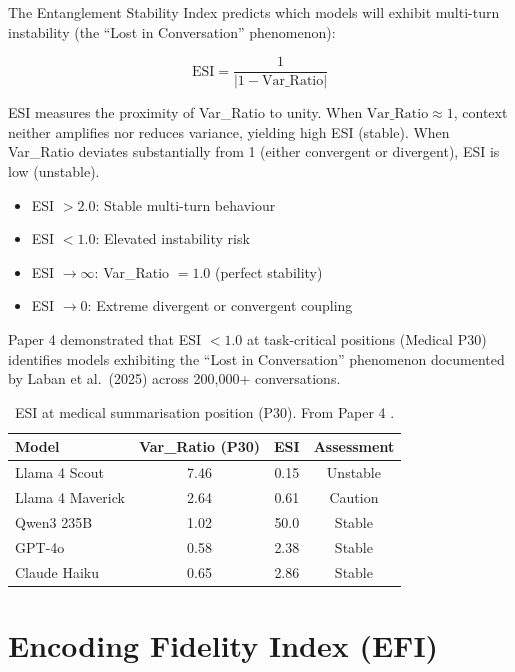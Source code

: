 \documentclass[11pt,a4paper]{article}
\begin{document}
The Entanglement Stability Index predicts which models will exhibit
multi-turn instability (the ``Lost in Conversation'' phenomenon):

\begin{equation}
    \text{ESI} = \frac{1}{\left| 1 - \text{Var\_Ratio} \right|}
\end{equation}

ESI measures the proximity of Var\_Ratio to unity. When
$\text{Var\_Ratio} \approx 1$, context neither amplifies nor
reduces variance, yielding high ESI (stable). When Var\_Ratio
deviates substantially from 1 (either convergent or divergent),
ESI is low (unstable).

\begin{itemize}
    \item ESI $> 2.0$: Stable multi-turn behaviour
    \item ESI $< 1.0$: Elevated instability risk
    \item ESI $\to \infty$: Var\_Ratio $= 1.0$ (perfect stability)
    \item ESI $\to 0$: Extreme divergent or convergent coupling
\end{itemize}

Paper 4 \citep{laxman2026d} demonstrated that ESI $< 1.0$ at task-critical
positions (Medical P30) identifies models exhibiting the ``Lost in Conversation''
phenomenon documented by Laban et al.\ (2025) across 200,000+ conversations.

\begin{table}[H]
\centering
\begin{tabular}{lccc}
\toprule
\textbf{Model} & \textbf{Var\_Ratio (P30)} & \textbf{ESI} & \textbf{Assessment} \\
\midrule
Llama 4 Scout    & 7.46 & 0.15 & Unstable \\
Llama 4 Maverick & 2.64 & 0.61 & Caution  \\
Qwen3 235B       & 1.02 & 50.0 & Stable   \\
GPT-4o           & 0.58 & 2.38 & Stable   \\
Claude Haiku     & 0.65 & 2.86 & Stable   \\
\bottomrule
\end{tabular}
\caption{ESI at medical summarisation position (P30). From Paper 4
\citep{laxman2026d}.}
\end{table}

\section{Encoding Fidelity Index (EFI)}
\label{sec:efi}
\end{document}
